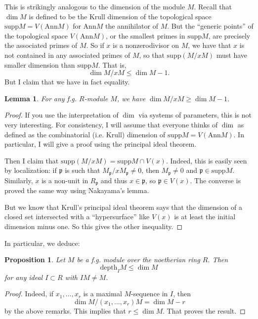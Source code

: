 \documentclass{article}
\newtheorem{lemma}{Lemma}
\newtheorem{proposition}{Proposition}
\begin{document}
\newcommand{\supp}{\mathrm{supp}}
This is strikingly analogous to the dimension of the module $M$. 
Recall that $\dim M$ is defined to be the Krull dimension of the topological
space  $\supp M = V( \mathrm{Ann} M)$ for $\mathrm{Ann} M$ the annihilator of $M$.
But the ``generic points'' of the topological space $V(\mathrm{Ann} M)$, or the
smallest primes in $\supp M$, are precisely the associated primes of $M$. 
So if $x$ is a nonzerodivisor on $M$, we have that $x$ is not contained
in any associated primes of $M$, so that $\supp(M/xM)$ must have smaller
dimension than $\supp M$. That is,
\[ \dim M/xM \leq \dim M - 1.  \]
But I claim that we have in fact equality. 

\begin{lemma} 
For any f.g. $R$-module $M$, we have $\dim M /xM \geq \dim M - 1$.
\end{lemma} 
\begin{proof} 
If you use the interpretation of $\dim $ via systems of parameters, this is not
very interesting. For consistency, I will assume that everyone thinks of $\dim
$ as defined as the combinatorial (i.e. Krull) dimension of $\supp M=V(\mathrm{Ann}
M)$.  
In particular, I will give a proof using the principal ideal theorem. 

Then I claim that $\supp(M/xM) = \supp M \cap V(x)$. Indeed, this is easily
seen by localization: if $\mathfrak{p}$ is such that $M_{\mathfrak{p}}/x
M_{\mathfrak{p}} \neq 0$, then $M_{\mathfrak{p}} \neq 0$ and $\mathfrak{p} \in
\supp M$. Similarly, $x$ is a non-unit in $R_\mathfrak{p}$ and thus $x \in
\mathfrak{p}$, so $\mathfrak{p} \in V(x)$. The converse is proved the same way
using Nakayama's lemma.

But we know that Krull's principal ideal theorem says that the dimension of a
closed set intersected with a ``hypersurface'' like $V(x)$ is at least the
initial dimension minus one. So this gives the other inequality. 
\end{proof} 

In particular, we deduce:
\begin{proposition} 
Let $M$ be a f.g. module over the noetherian ring $R$. Then
\[ \mathrm{depth}_I M \leq \dim M  \]
for any ideal $I \subset R$ with $IM \neq M$.
\end{proposition} 
\begin{proof} 
Indeed, if $x_1, \dots, x_r$ is a maximal $M$-sequence in $I$, then 
\[ \dim M/(x_1 , \dots, x_r) M = \dim M - r  \]
by the above remarks. 
This implies that $r \leq \dim M$. That proves the result. 
\end{proof} 
\end{document}
